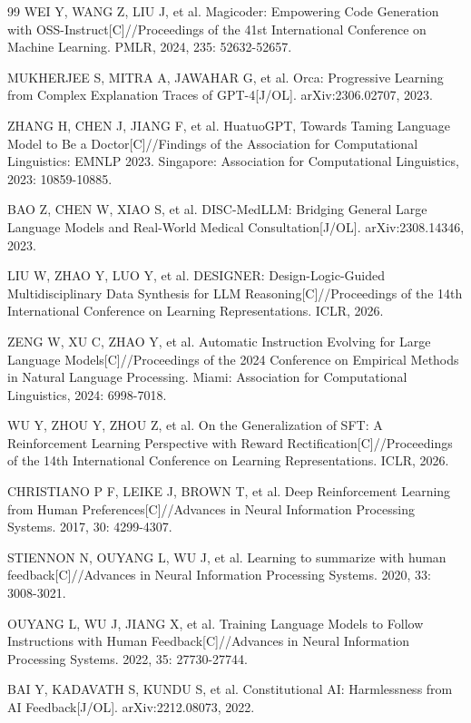 \documentclass[fontset=fandol,type=master,campus=shenzhen,etitleauto=true]{hithesisbook}
\begin{document}
\begin{thebibliography}{99}
 WEI Y, WANG Z, LIU J, et al. Magicoder: Empowering Code Generation with OSS-Instruct[C]//Proceedings of the 41st International Conference on Machine Learning. PMLR, 2024, 235: 52632-52657.

 MUKHERJEE S, MITRA A, JAWAHAR G, et al. Orca: Progressive Learning from Complex Explanation Traces of GPT-4[J/OL]. arXiv:2306.02707, 2023.

 ZHANG H, CHEN J, JIANG F, et al. HuatuoGPT, Towards Taming Language Model to Be a Doctor[C]//Findings of the Association for Computational Linguistics: EMNLP 2023. Singapore: Association for Computational Linguistics, 2023: 10859-10885.

 BAO Z, CHEN W, XIAO S, et al. DISC-MedLLM: Bridging General Large Language Models and Real-World Medical Consultation[J/OL]. arXiv:2308.14346, 2023.

 LIU W, ZHAO Y, LUO Y, et al. DESIGNER: Design-Logic-Guided Multidisciplinary Data Synthesis for LLM Reasoning[C]//Proceedings of the 14th International Conference on Learning Representations. ICLR, 2026.

 ZENG W, XU C, ZHAO Y, et al. Automatic Instruction Evolving for Large Language Models[C]//Proceedings of the 2024 Conference on Empirical Methods in Natural Language Processing. Miami: Association for Computational Linguistics, 2024: 6998-7018.

 WU Y, ZHOU Y, ZHOU Z, et al. On the Generalization of SFT: A Reinforcement Learning Perspective with Reward Rectification[C]//Proceedings of the 14th International Conference on Learning Representations. ICLR, 2026.

 CHRISTIANO P F, LEIKE J, BROWN T, et al. Deep Reinforcement Learning from Human Preferences[C]//Advances in Neural Information Processing Systems. 2017, 30: 4299-4307.

 STIENNON N, OUYANG L, WU J, et al. Learning to summarize with human feedback[C]//Advances in Neural Information Processing Systems. 2020, 33: 3008-3021.

 OUYANG L, WU J, JIANG X, et al. Training Language Models to Follow Instructions with Human Feedback[C]//Advances in Neural Information Processing Systems. 2022, 35: 27730-27744.

 BAI Y, KADAVATH S, KUNDU S, et al. Constitutional AI: Harmlessness from AI Feedback[J/OL]. arXiv:2212.08073, 2022.


\end{thebibliography}
\end{document}
